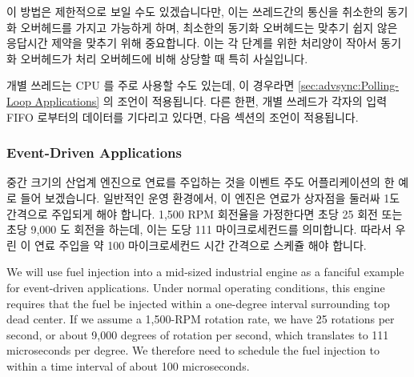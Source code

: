 \fi

이 방법은 제한적으로 보일 수도 있겠습니다만, 이는 쓰레드간의 통신을 취소한의
동기화 오버헤드를 가지고 가능하게 하며, 최소한의 동기화 오버헤드는 맞추기 쉽지
않은 응답시간 제약을 맞추기 위해 중요합니다.
이는 각 단계를 위한 처리양이 작아서 동기화 오버헤드가 처리 오버헤드에 비해
상당할 때 특히 사실입니다.

개별 쓰레드는 CPU 를 주로 사용할 수도 있는데, 이 경우라면
\cref{sec:advsync:Polling-Loop Applications} 의 조언이 적용됩니다.
다른 한편, 개별 쓰레드가 각자의 입력 FIFO 로부터의 데이터를 기다리고 있다면,
다음 섹션의 조언이 적용됩니다.

\subsubsection{Event-Driven Applications}
\label{sec:advsync:Event-Driven Applications}

중간 크기의 산업계 엔진으로 연료를 주입하는 것을 이벤트 주도 어플리케이션의 한
예로 들어 보겠습니다.
일반적인 운영 환경에서, 이 엔진은 연료가 상자점을 둘러싸 1도 간격으로 주입되게
해야 합니다.
1,500 RPM 회전율을 가정한다면 초당 25 회전 또는 초당 9,000 도 회전을 하는데,
이는 도당 111 마이크로세컨드를 의미합니다.
따라서 우린 이 연료 주입을 약 100 마이크로세컨드 시간 간격으로 스케쥴 해야
합니다.

\iffalse

We will use fuel injection into a mid-sized industrial engine as a
fanciful example for event-driven applications.
Under normal operating conditions, this engine requires that the fuel
be injected within a one-degree interval surrounding top dead center.
If we assume a 1,500-RPM rotation rate, we have 25 rotations per second,
or about 9,000 degrees of rotation per second, which translates to
111 microseconds per degree.
We therefore need to schedule the fuel injection to within a time
interval of about 100 microseconds.

